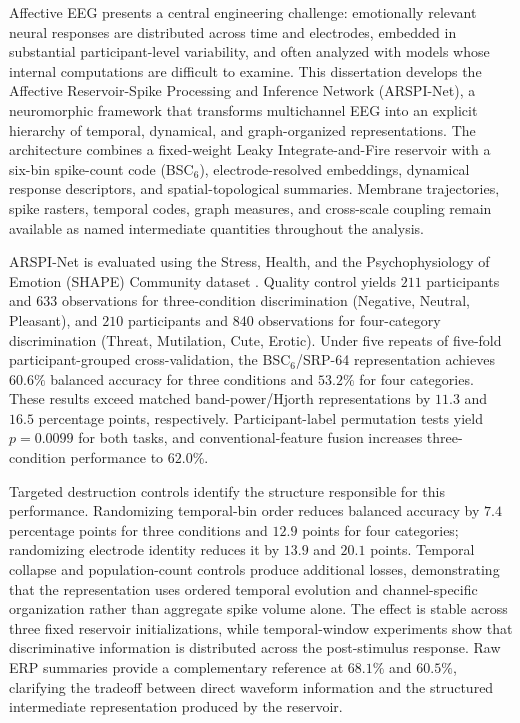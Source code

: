 \documentclass[12pt]{report}
\begin{document}
\noindent
Affective EEG presents a central engineering challenge: emotionally relevant neural responses are distributed across time and electrodes, embedded in substantial participant-level variability, and often analyzed with models whose internal computations are difficult to examine. This dissertation develops the Affective Reservoir-Spike Processing and Inference Network (ARSPI-Net), a neuromorphic framework that transforms multichannel EEG into an explicit hierarchy of temporal, dynamical, and graph-organized representations. The architecture combines a fixed-weight Leaky Integrate-and-Fire reservoir with a six-bin spike-count code (BSC$_6$), electrode-resolved embeddings, dynamical response descriptors, and spatial-topological summaries. Membrane trajectories, spike rasters, temporal codes, graph measures, and cross-scale coupling remain available as named intermediate quantities throughout the analysis.

ARSPI-Net is evaluated using the Stress, Health, and the Psychophysiology of Emotion (SHAPE) Community dataset \cite{noauthor_shape_2018}. Quality control yields $211$ participants and $633$ observations for three-condition discrimination (Negative, Neutral, Pleasant), and $210$ participants and $840$ observations for four-category discrimination (Threat, Mutilation, Cute, Erotic). Under five repeats of five-fold participant-grouped cross-validation, the BSC$_6$/SRP-64 representation achieves $60.6\%$ balanced accuracy for three conditions and $53.2\%$ for four categories. These results exceed matched band-power/Hjorth representations by $11.3$ and $16.5$ percentage points, respectively. Participant-label permutation tests yield $p=0.0099$ for both tasks, and conventional-feature fusion increases three-condition performance to $62.0\%$.

Targeted destruction controls identify the structure responsible for this performance. Randomizing temporal-bin order reduces balanced accuracy by $7.4$ percentage points for three conditions and $12.9$ points for four categories; randomizing electrode identity reduces it by $13.9$ and $20.1$ points. Temporal collapse and population-count controls produce additional losses, demonstrating that the representation uses ordered temporal evolution and channel-specific organization rather than aggregate spike volume alone. The effect is stable across three fixed reservoir initializations, while temporal-window experiments show that discriminative information is distributed across the post-stimulus response. Raw ERP summaries provide a complementary reference at $68.1\%$ and $60.5\%$, clarifying the tradeoff between direct waveform information and the structured intermediate representation produced by the reservoir.
\end{document}
